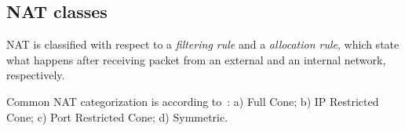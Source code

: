 \documentclass{acm_proc_article-sp}
\begin{document}
% 
% 

\subsection{NAT classes}\label{sec:nat}
NAT is classified with respect to a \emph{filtering rule} and a \emph{allocation rule}, which state what happens after receiving
packet from an external and an internal network, respectively.

Common NAT categorization is according to~\citep{rfc3489}: a) Full Cone;
b) IP Restricted Cone; c) Port Restricted Cone; d) Symmetric.
\end{document}
